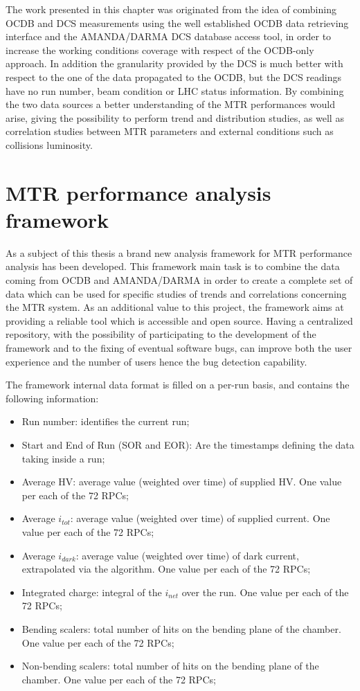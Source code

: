 The work presented in this chapter was originated from the idea of combining OCDB and DCS measurements using the well established OCDB data retrieving interface and the AMANDA/DARMA DCS database access tool, in order to increase the working conditions coverage with respect of the OCDB-only approach.
In addition the granularity provided by the DCS is much better with respect to the one of the data propagated to the OCDB, but the DCS readings have no run number, beam condition or LHC status information.
By combining the two data sources a better understanding of the MTR performances would arise, giving the possibility to perform trend and distribution studies, as well as correlation studies between MTR parameters and external conditions such as collisions luminosity.

\section{MTR performance analysis framework}
As a subject of this thesis a brand new analysis framework for MTR performance analysis has been developed.
This framework main task is to combine the data coming from OCDB and AMANDA/DARMA in order to create a complete set of data which can be used for specific studies of trends and correlations concerning the MTR system.
As an additional value to this project, the framework aims at providing a reliable tool which is accessible and open source.
Having a centralized repository, with the possibility of participating to the development of the framework and to the fixing of eventual software bugs, can improve both the user experience and the number of users hence the bug detection capability.

The framework internal data format is filled on a per-run basis, and contains the following information:
\begin{itemize}
\item Run number: identifies the current run;
\item Start and End of Run (SOR and EOR): Are the timestamps defining the data taking inside a run;
\item Average HV: average value (weighted over time) of supplied HV. One value per each of the 72 RPCs;
\item Average $i_{tot}$: average value (weighted over time) of supplied current.  One value per each of the 72 RPCs;
\item Average $i_{dark}$: average value (weighted over time) of dark current, extrapolated via the algorithm.  One value per each of the 72 RPCs;
\item Integrated charge: integral of the $i_{net}$ over the run.  One value per each of the 72 RPCs;
\item Bending scalers: total number of hits on the bending plane of the chamber.  One value per each of the 72 RPCs;
\item Non-bending scalers: total number of hits on the bending plane of the chamber.  One value per each of the 72 RPCs;
\end{itemize}

